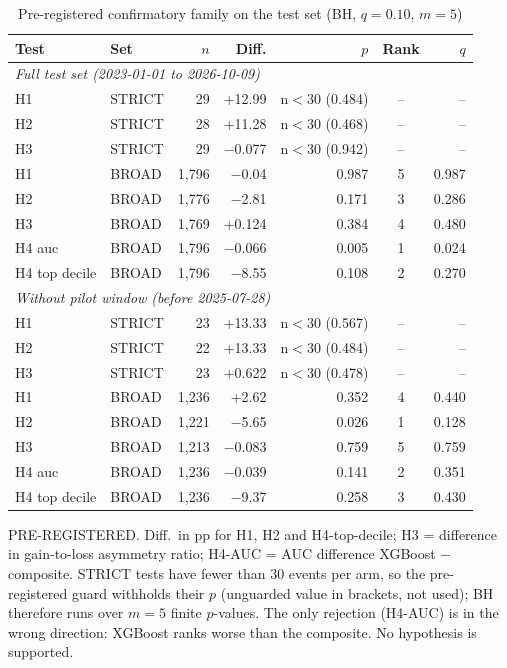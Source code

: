 \documentclass[conference]{IEEEtran}
\begin{document}
\begin{table}[t]
\centering
\caption{Pre-registered confirmatory family on the test set (BH, $q=0.10$, $m=5$)}
\label{tab:confirm}
\footnotesize
\setlength{\tabcolsep}{4pt}
\begin{tabular}{llrrrcr}
\toprule
\textbf{Test} & \textbf{Set} & $n$ & \textbf{Diff.} & $p$ & \textbf{Rank} & $q$ \\
\midrule
\multicolumn{7}{l}{\textit{Full test set (2023-01-01 to 2026-10-09)}} \\
H1 & STRICT & 29 & +12.99 & n$<$30 (0.484) & -- & -- \\
H2 & STRICT & 28 & +11.28 & n$<$30 (0.468) & -- & -- \\
H3 & STRICT & 29 & \ensuremath{-}0.077 & n$<$30 (0.942) & -- & -- \\
H1 & BROAD & 1,796 & \ensuremath{-}0.04 & 0.987 & 5 & 0.987 \\
H2 & BROAD & 1,776 & \ensuremath{-}2.81 & 0.171 & 3 & 0.286 \\
H3 & BROAD & 1,769 & +0.124 & 0.384 & 4 & 0.480 \\
H4 auc & BROAD & 1,796 & \ensuremath{-}0.066 & 0.005 & 1 & 0.024 \\
H4 top decile & BROAD & 1,796 & \ensuremath{-}8.55 & 0.108 & 2 & 0.270 \\
\midrule
\multicolumn{7}{l}{\textit{Without pilot window (before 2025-07-28)}} \\
H1 & STRICT & 23 & +13.33 & n$<$30 (0.567) & -- & -- \\
H2 & STRICT & 22 & +13.33 & n$<$30 (0.484) & -- & -- \\
H3 & STRICT & 23 & +0.622 & n$<$30 (0.478) & -- & -- \\
H1 & BROAD & 1,236 & +2.62 & 0.352 & 4 & 0.440 \\
H2 & BROAD & 1,221 & \ensuremath{-}5.65 & 0.026 & 1 & 0.128 \\
H3 & BROAD & 1,213 & \ensuremath{-}0.083 & 0.759 & 5 & 0.759 \\
H4 auc & BROAD & 1,236 & \ensuremath{-}0.039 & 0.141 & 2 & 0.351 \\
H4 top decile & BROAD & 1,236 & \ensuremath{-}9.37 & 0.258 & 3 & 0.430 \\
\bottomrule
\end{tabular}
\par\smallskip\parbox{0.98\linewidth}{\scriptsize\raggedright PRE-REGISTERED. Diff.\ in pp for H1, H2 and H4-top-decile; H3 = difference in gain-to-loss asymmetry ratio; H4-AUC = AUC difference XGBoost $-$ composite. STRICT tests have fewer than 30 events per arm, so the pre-registered guard withholds their $p$ (unguarded value in brackets, not used); BH therefore runs over $m=5$ finite $p$-values. The only rejection (H4-AUC) is in the wrong direction: XGBoost ranks worse than the composite. No hypothesis is supported.}
\end{table}
\end{document}
